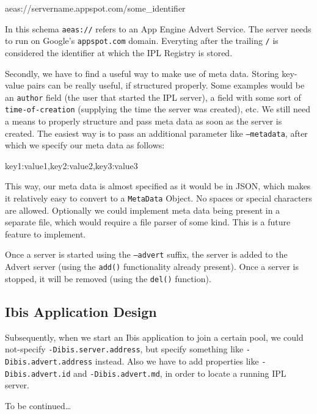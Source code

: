 \begin{center}
\begin{code}
aeas://servername.appspot.com/some_identifier
\end{code}
\end{center}

In this schema \texttt{aeas://} refers to an App Engine Advert Service. The
server needs to run on Google's \texttt{appspot.com} domain. Everyting after
the trailing \texttt{/} is considered the identifier at which the IPL Registry
is stored.

Secondly, we have to find a useful way to make use of meta data. Storing
key-value pairs can be really useful, if structured properly. Some examples
would be an \texttt{author} field (the user that started the IPL server), a
field with some sort of \texttt{time-of-creation} (supplying the time the
server was created), etc. We still need a means to properly structure
and pass meta data as soon as the server is created. The easiest way is to pass
an additional parameter like \texttt{--metadata}, after which we specify our
meta data as follows:

\begin{center}
\begin{code}
key1:value1,key2:value2,key3:value3
\end{code}
\end{center}

This way, our meta data is almost specified as it would be in JSON, which makes
it relatively easy to convert to a \texttt{MetaData} Object. No spaces or
special characters are allowed. Optionally we could implement meta data being
present in a separate file, which would require a file parser of some kind.
This is a future feature to implement.

Once a server is started using the \texttt{--advert} suffix, the server is added
to the Advert server (using the \texttt{add()} functionality already present).
Once a server is stopped, it will be removed (using the \texttt{del()}
function).

\subsection{Ibis Application Design}
Subsequently, when we start an Ibis application to join a certain pool, we
could not-specify \texttt{-Dibis.server.address}, but specify something like
\texttt{-Dibis.advert.address} instead. Also we have to add properties
like \texttt{-Dibis.advert.id} and \texttt{-Dibis.advert.md}, in order to
locate a running IPL server.

To be continued\ldots

